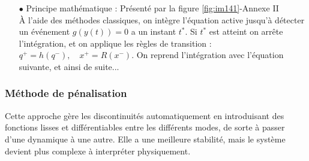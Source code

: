 \documentclass[12pt, oneside]{report} %
\theoremstyle{definition}
\theoremstyle{remark}
\begin{document}
\begin{itemize}
	\item[$\bullet$] {Principe mathématique : } Présenté par la figure \ref{fig:im141}-Annexe II\\
	À l'aide des méthodes classiques, on intègre l'équation active jusqu'à détecter un événement $g(y(t))  = 0 $ a un instant $t^*$. Si $t^*$ est atteint on arrête l'intégration, et on applique les règles de transition : $q^+ = h(q^-), \quad x^+ = R(x^-)$. On reprend l'intégration avec l'équation suivante, et ainsi de suite...
			
	
			
%		
	\end{itemize}
		
		\subsubsection{Méthode de pénalisation} 
		Cette approche gère les discontinuités automatiquement en introduisant des fonctions lisses et différentiables entre les différents modes, de sorte à passer d'une dynamique à une autre. Elle a une meilleure stabilité, mais le système devient plus complexe à interpréter physiquement.  
		
\end{document}
